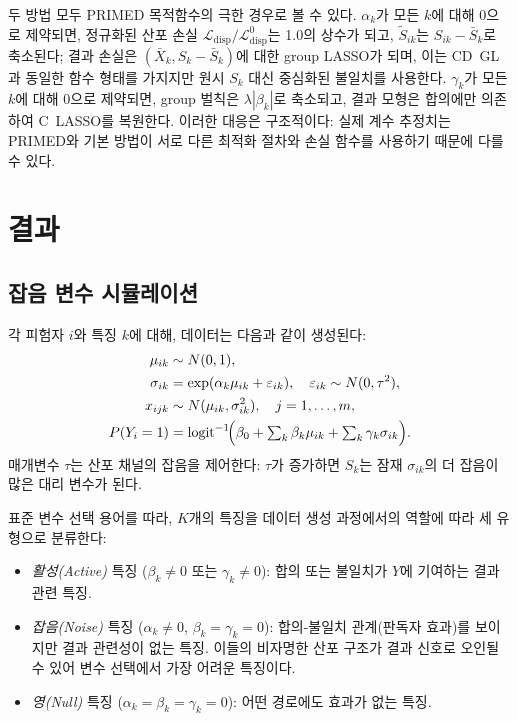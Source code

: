\documentclass[a4paper,11pt]{article}
\begin{document}
두 방법 모두 PRIMED 목적함수의 극한 경우로 볼 수 있다.
$\alpha_k$가 모든 $k$에 대해 0으로 제약되면, 정규화된 산포 손실 $\mathcal{L}_{\mathrm{disp}}/\mathcal{L}_{\mathrm{disp}}^0$는 1.0의 상수가 되고, $\tilde S_{ik}$는 $S_{ik} - \bar S_k$로 축소된다; 결과 손실은 $(\bar X_k, S_k - \bar S_k)$에 대한 group LASSO가 되며, 이는 CD~GL과 동일한 함수 형태를 가지지만 원시 $S_k$ 대신 중심화된 불일치를 사용한다.
$\gamma_k$가 모든 $k$에 대해 0으로 제약되면, group 벌칙은 $\lambda|\beta_k|$로 축소되고, 결과 모형은 합의에만 의존하여 C~LASSO를 복원한다.
이러한 대응은 구조적이다: 실제 계수 추정치는 PRIMED와 기본 방법이 서로 다른 최적화 절차와 손실 함수를 사용하기 때문에 다를 수 있다.


\section{결과}\label{sec:results}

\subsection{잡음 변수 시뮬레이션}\label{sec:noise_sim}

각 피험자 $i$와 특징 $k$에 대해, 데이터는 다음과 같이 생성된다:
\begin{align}
  \mu_{ik} &\sim N(0,1), \notag \\
  \sigma_{ik} &= \exp(\alpha_k \mu_{ik} + \varepsilon_{ik}), \quad \varepsilon_{ik} \sim N(0, \tau^2), \label{eq:dgp} \\
  x_{ijk} &\sim N(\mu_{ik}, \sigma_{ik}^2), \quad j=1,\dots,m, \notag \\
  P(Y_i = 1) &= \mathrm{logit}^{-1}\!\Bigl(\beta_0 + \textstyle\sum_k \beta_k \mu_{ik} + \sum_k \gamma_k \sigma_{ik}\Bigr). \notag
\end{align}
매개변수 $\tau$는 산포 채널의 잡음을 제어한다: $\tau$가 증가하면 $S_k$는 잠재 $\sigma_{ik}$의 더 잡음이 많은 대리 변수가 된다.

표준 변수 선택 용어를 따라, $K$개의 특징을 데이터 생성 과정에서의 역할에 따라 세 유형으로 분류한다:
\begin{itemize}
  \item \emph{활성(Active)} 특징 ($\beta_k \neq 0$ 또는 $\gamma_k \neq 0$): 합의 또는 불일치가 $Y$에 기여하는 결과 관련 특징.
  \item \emph{잡음(Noise)} 특징 ($\alpha_k \neq 0$, $\beta_k = \gamma_k = 0$): 합의-불일치 관계(판독자 효과)를 보이지만 결과 관련성이 없는 특징. 이들의 비자명한 산포 구조가 결과 신호로 오인될 수 있어 변수 선택에서 가장 어려운 특징이다.
  \item \emph{영(Null)} 특징 ($\alpha_k = \beta_k = \gamma_k = 0$): 어떤 경로에도 효과가 없는 특징.
\end{itemize}
\end{document}

